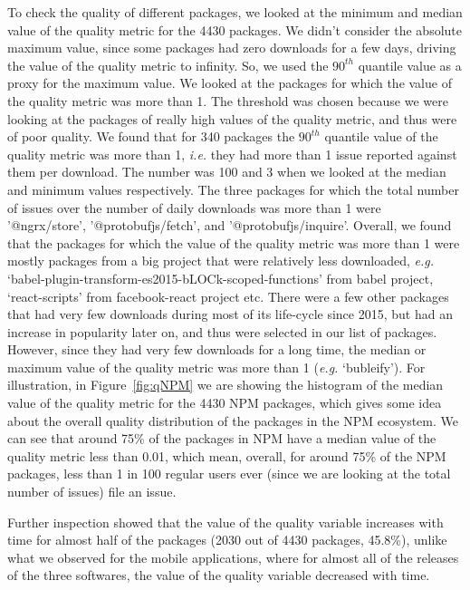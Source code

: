 \documentclass[smallcondensed]{svjour3}     %
\begin{document}
To check the quality of different packages, we looked at the minimum and median value of the quality metric for the 4430 packages. We didn't consider the absolute maximum value, since some packages had zero downloads for a few days, driving the value of the quality metric to infinity. So, we used the $90^{th}$ quantile value as a proxy for the maximum value. We looked at the packages for which the value of the quality metric was more than 1. The threshold was chosen because we were looking at the packages of really high values of the quality metric, and thus were of poor quality. We found that for 340 packages the $90^{th}$ quantile value of the quality metric was more than 1, \emph{i.e.} they had more than 1 issue reported against them per download. The number was 100 and 3 when we looked at the median and minimum values respectively. The three packages for which the total number of issues over the number of daily downloads was more than 1 were '@ngrx/store', '@protobufjs/fetch', and '@protobufjs/inquire'. Overall, we found that the packages for which the value of the quality metric was more than 1 were mostly packages from a big project that were relatively less downloaded, \emph{e.g.} `babel-plugin-transform-es2015-bLOCk-scoped-functions' from babel project, `react-scripts' from facebook-react project etc. There were a few other packages that had very few downloads during most of its life-cycle since 2015, but had an increase in popularity later on, and thus were selected in our list of packages. However, since they had very few downloads for a long time, the median or maximum value of the quality metric was more than 1 (\emph{e.g.} `bubleify'). 
For illustration, in Figure~\ref{fig:qNPM} we are showing the histogram of the median value of the quality metric for the 4430 NPM packages, which gives some idea about the overall quality distribution of the packages in the NPM ecosystem. We can see that around 75\% of the packages in NPM have a median value of the quality metric less than 0.01, which mean, overall, for around 75\% of the NPM packages, less than 1 in 100 regular users ever (since we are looking at the total number of issues) file an issue.

Further inspection showed that the value of the quality variable increases with time for almost half of the packages (2030 out of 4430 packages, 45.8\%), unlike what we observed for the mobile applications, where for almost all of the releases of the three softwares, the value of the quality variable decreased with time.
\end{document}

